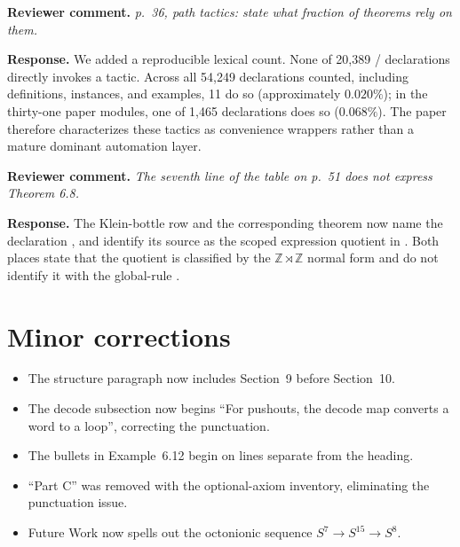 \documentclass[11pt]{article}
\newcommand{\review}[1]{\par\medskip\noindent
  \textbf{\color{blue!55!black}Reviewer comment.} \emph{#1}\par}
\newcommand{\response}{\par\smallskip\noindent
  \textbf{\color{green!35!black}Response.} }
\begin{document}
\review{p.~36, path tactics: state what fraction of theorems rely on them.}
\response
We added a reproducible lexical count.  None of 20,389
/ declarations directly invokes a 
tactic.  Across all 54,249 declarations counted, including definitions,
instances, and examples, 11 do so (approximately \(0.020\%\)); in the thirty-one
paper modules, one of 1,465 declarations does so (\(0.068\%\)).  The paper
therefore characterizes these tactics as convenience wrappers rather than a
mature dominant automation layer.

\review{The seventh line of the table on p.~51 does not express Theorem 6.8.}
\response
The Klein-bottle row and the corresponding theorem now name the declaration
, and identify its source as the
scoped expression quotient in .  Both places
state that the quotient is classified by the
\(\mathbb Z\rtimes\mathbb Z\) normal form and do not identify it with the
global-rule .

\section*{Minor corrections}

\begin{itemize}[leftmargin=*]
  \item The structure paragraph now includes Section~9 before Section~10.
  \item The decode subsection now begins ``For pushouts, the decode map
        converts a word to a loop'', correcting the punctuation.
  \item The bullets in Example~6.12 begin on lines separate from the heading.
  \item ``Part C'' was removed with the optional-axiom
        inventory, eliminating the punctuation issue.
  \item Future Work now spells out the octonionic sequence
        \(S^7\to S^{15}\to S^8\).
\end{itemize}
\end{document}
